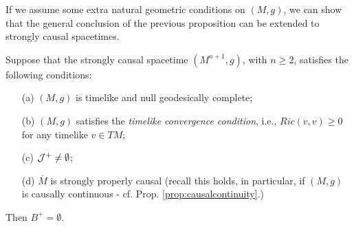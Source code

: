 If we assume some extra natural geometric conditions on $(M,g)$, we can show that the general conclusion of the previous proposition can be extended to strongly causal spacetimes.

\begin{theorem}
\label{completeness2}
Suppose that the strongly causal spacetime $(M^{n+1},g)$, with $n\geq 2$, satisfies the following conditions:
\begin{itemize}
\item[(a)] $(M,g)$ is timelike and null geodesically complete;
\item[(b)] $(M,g)$ satisfies the {\em timelike convergence condition}, i.e., $Ric(v,v)\geq 0$ for any timelike $v\in TM$;
\item[(c)] ${\cal J}^+ \neq \emptyset$;
  \item[(d)] $\overline{M}$ is strongly properly causal (recall this holds, in particular, if $(M,g)$ is causally continuous - cf. Prop. \ref{prop:causalcontinuity}.)
\end{itemize}
Then $B^+ = \emptyset$.
\end{theorem}
